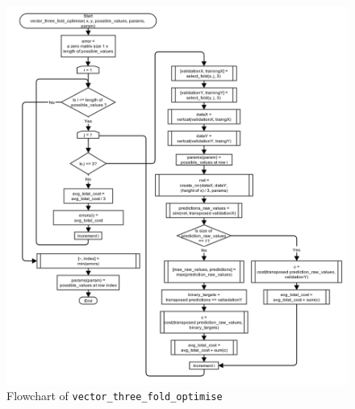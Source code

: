 \documentclass[10pt,a4paper]{article}
\begin{document}
\begin{figure}[!ht]
	\centering
	\includegraphics[height=\textheight, width=\textwidth]{images/flow_chart/vector_three_fold_optimise.png}
	\caption{Flowchart of \tt{vector\_three\_fold\_optimise}}
	\label{fig:vector_three_fold_optimise}
\end{figure}
\end{document}
